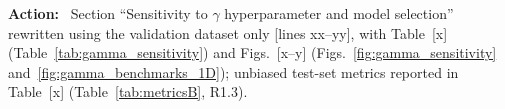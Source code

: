 \documentclass[11pt]{article}
\newenvironment{action}{\par\smallskip\noindent\color{resp}\textbf{Action:}\ }{\par}
\newcommand{\tbd}[1]{\textcolor{note}{\textsf{[#1]}}}
\newcommand{\lines}[1]{\tbd{lines #1}}
\begin{document}
\begin{action}
Section ``Sensitivity to $\gamma$ hyperparameter and model selection'' rewritten using the validation dataset only
\lines{xx--yy}, with Table~\tbd{x} (Table~\ref{tab:gamma_sensitivity}) and Figs.~\tbd{x--y}
(Figs.~\ref{fig:gamma_sensitivity} and~\ref{fig:gamma_benchmarks_1D}); unbiased test-set metrics reported in
Table~\tbd{x} (Table~\ref{tab:metricsB}, R1.3).
\end{action}
\end{document}
